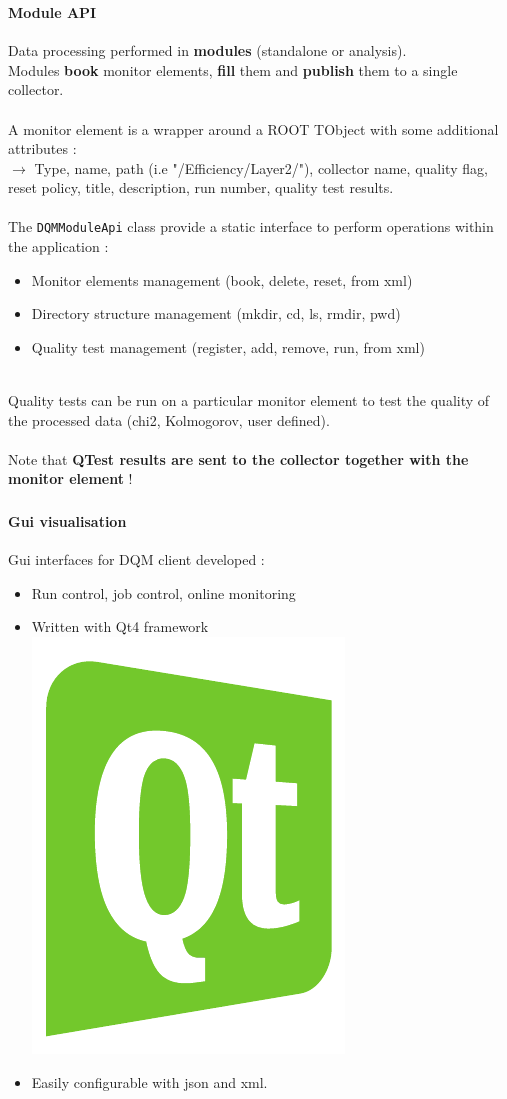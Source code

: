 \documentclass[8pt]{beamer}
\begin{document}
    
    \begin{frame}[containsverbatim]
      \frametitle{\secname}
      \framesubtitle{Module API}
      
      Data processing performed in \textbf{modules} (standalone or analysis). \\
      Modules \textbf{book} monitor elements, \textbf{fill} them and \textbf{publish} them to a single collector. \\
      ~ \\
      A monitor element is a wrapper around a ROOT TObject with some additional attributes : \\
      $\rightarrow$ Type, name, path (i.e "/Efficiency/Layer2/"), collector name, quality flag, reset policy, title, description, run number, quality test results. \\
      ~ \\
      The \verb|DQMModuleApi| class provide a static interface to perform operations within the application :
      \begin{itemize}
        \item Monitor elements management (book, delete, reset, from xml)
        \item Directory structure management (mkdir, cd, ls, rmdir, pwd)
        \item Quality test management (register, add, remove, run, from xml)
      \end{itemize}
      ~ \\
      Quality tests can be run on a particular monitor element to test the quality of the processed data (chi2, Kolmogorov, user defined). \\ 
      ~ \\
      Note that \textbf{QTest results are sent to the collector together with the monitor element} ! 
    \end{frame}
  
  
  \begin{frame}
    \frametitle{\secname}
    \framesubtitle{Gui visualisation}
        
	  Gui interfaces for DQM client developed :
            
      \begin{itemize}
        \item Run control, job control, online monitoring
        \item Written with Qt4 framework     \includegraphics[width=.03\textwidth]{logo/Qt_CMYK_color}
        \item Easily configurable with json and xml.
      \end{itemize}
    
      \end{frame} 
      
\end{document}
